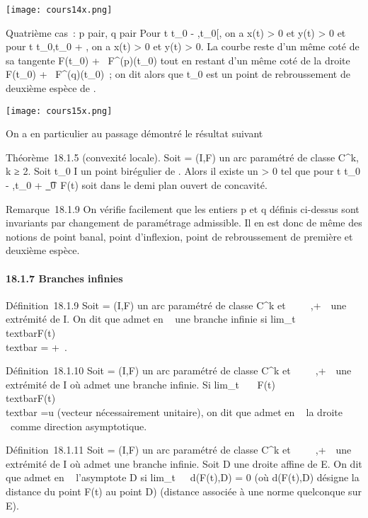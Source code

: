\documentclass[]{article}
\begin{document}
\text\texttt{[image: cours14x.png]}

Quatrième cas~: p pair, q pair Pour t \in{]}t\_0 -
\eta,t\_0{[}, on a x(t) \textgreater{} 0 et y(t) \textgreater{} 0
et pour t \in{]}t\_0,t\_0 + \eta{[}, on a x(t) \textgreater{}
0 et y(t) \textgreater{} 0. La courbe reste d'un même coté de sa
tangente F(t\_0) + ~F^(p)(t\_0) tout en
restant d'un même coté de la droite F(t\_0) +
~F^(q)(t\_0)~; on dit alors que t\_0 est un
point de rebroussement de deuxième espèce de \Gamma.

\text\texttt{[image: cours15x.png]}

On a en particulier au passage démontré le résultat suivant

Théorème~18.1.5 (convexité locale). Soit \Gamma = (I,F) un arc paramétré de
classe C^k, k ≥ 2. Soit t\_0 \in I un point birégulier
de \Gamma. Alors il existe un \eta \textgreater{} 0 tel que pour t
\in{]}t\_0 - \eta,t\_0 +
\eta{[}\diagdown\t\_0\, F(t) soit dans le
demi plan ouvert de concavité.

Remarque~18.1.9 On vérifie facilement que les entiers p et q définis
ci-dessus sont invariants par changement de paramétrage admissible. Il
en est donc de même des notions de point banal, point d'inflexion, point
de rebroussement de première et deuxième espèce.

\paragraph{18.1.7 Branches infinies}

Définition~18.1.9 Soit \Gamma = (I,F) un arc paramétré de classe
C^k et \alpha~ \in {}~ \cup\-\infty~,+\infty~\ une
extrémité de I. On dit que \Gamma admet en \alpha~ une branche infinie si
lim\_t\rightarrow~\alpha~~\\textbar{}F(t)\\textbar{}
= +\infty~.

Définition~18.1.10 Soit \Gamma = (I,F) un arc paramétré de classe
C^k et \alpha~ \in {}~ \cup\-\infty~,+\infty~\ une
extrémité de I où \Gamma admet une branche infinie. Si
lim\_t\rightarrow~\alpha~~ F(t) \over
\\textbar{}F(t)\\textbar{}
=\vec u (vecteur nécessairement unitaire), on dit que
\Gamma admet en \alpha~ la droite ~\vecu comme direction
asymptotique.

Définition~18.1.11 Soit \Gamma = (I,F) un arc paramétré de classe
C^k et \alpha~ \in {}~ \cup\-\infty~,+\infty~\ une
extrémité de I où \Gamma admet une branche infinie. Soit D une droite affine
de E. On dit que \Gamma admet en \alpha~ l'asymptote D si
lim\_t\rightarrow~\alpha~~d(F(t),D) = 0 (où d(F(t),D)
désigne la distance du point F(t) au point D) (distance associée à une
norme quelconque sur E).
\end{document}
